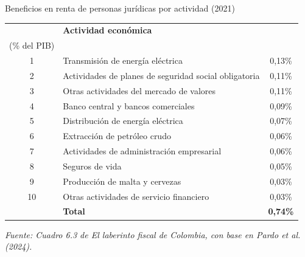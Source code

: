 \begin{frame}{Beneficios en renta de personas jurídicas por actividad (2021)}
\begin{table}[h!]
    \centering
    \small
    \setlength{\tabcolsep}{4pt}
    \renewcommand{\arraystretch}{1.05}
    \begin{tabular}{@{}c p{} c@{}}
        \toprule
        & \textbf{Actividad económica} & \shortstack{\textbf{Gasto tributario}\\(\% del PIB)} \\
        \midrule
        1  & Transmisión de energía eléctrica & 0,13\% \\
        2  & Actividades de planes de seguridad social obligatoria & 0,11\% \\
        3  & Otras actividades del mercado de valores & 0,11\% \\
        4  & Banco central y bancos comerciales & 0,09\% \\
        5  & Distribución de energía eléctrica & 0,07\% \\
        6  & Extracción de petróleo crudo & 0,06\% \\
        7  & Actividades de administración empresarial & 0,06\% \\
        8  & Seguros de vida & 0,05\% \\
        9  & Producción de malta y cervezas & 0,03\% \\
        10 & Otras actividades de servicio financiero & 0,03\% \\
        \midrule
        & \textbf{Total} & \textbf{0,74\%} \\
        \bottomrule
    \end{tabular}
    \vspace{0.12cm}
    \par\scriptsize{\textit{Fuente: Cuadro 6.3 de El laberinto fiscal de Colombia, con base en Pardo et al. (2024).}}
\end{table}

\end{frame}
